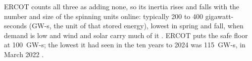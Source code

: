ERCOT counts all three as adding none, so its inertia rises and falls with the number and size of the spinning units online: typically 200 to 400 gigawatt-seconds (\mbox{GW-s}, the unit of that stored energy), lowest in spring and fall, when demand is low and wind and solar carry much of it \autocite{ercot2024asstudy}. %
ERCOT puts the safe floor at 100~\mbox{GW-s}; the lowest it had seen in the ten years to 2024 was 115~\mbox{GW-s}, in March 2022 \autocite{ercot2024asstudy}. %

